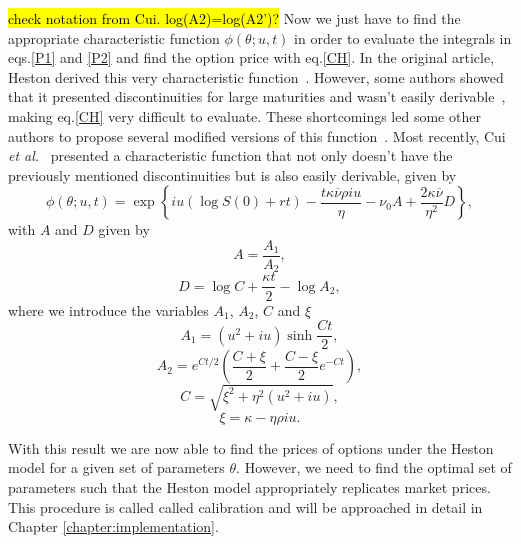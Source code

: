 \hl{check notation from Cui. log(A2)=log(A2')?}
Now we just have to find the appropriate characteristic function $\phi(\theta;u,t)$ in order to evaluate the integrals in eqs.\eqref{P1} and \eqref{P2} and find the option price with eq.\eqref{CH}. In the original article, Heston derived this very characteristic function~\cite{Heston}. However, some authors showed that it presented discontinuities for large maturities and wasn't easily derivable~\cite{Kahl}, making eq.\eqref{CH} very difficult to evaluate. These shortcomings led some other authors to propose several modified versions of this function~\cite{Rollin,Schoutens}. Most recently, Cui \textit{et al.}~\cite{Cui} presented a characteristic function that not only doesn't have the previously mentioned discontinuities but is also easily derivable, given by
\begin{equation}
\phi(\theta;u,t)=\exp\left\{iu\left(\log S(0)+rt\right)-\frac{t\kappa\overline{\nu}\rho iu}{\eta}-\nu_0A+\frac{2\kappa\overline{\nu}}{\eta^2}D\right\},
\end{equation}
\noindent with $A$ and $D$ given by
\begin{equation}
A=\frac{A_1}{A_2},
\end{equation}
\begin{equation}
D=\log C+\frac{\kappa t}{2}-\log A_2,
\end{equation}
\noindent where we introduce the variables $A_1$, $A_2$, $C$  and $\xi$
\begin{equation}
A_1=(u^2+iu)\sinh\frac{Ct}{2},
\end{equation}
\begin{equation}
A_2=e^{Ct/2}\left(\frac{C+\xi}{2}+\frac{C-\xi}{2}e^{-Ct}\right),
\end{equation}
\begin{equation}
C=\sqrt{\xi^2+\eta^2(u^2+iu)},
\end{equation}
\begin{equation}
\xi=\kappa-\eta\rho iu.
\end{equation}

With this result we are now able to find the prices of options under the Heston model for a given set of parameters $\theta$. However, we need to find the optimal set of parameters such that the Heston model appropriately replicates market prices. This procedure is called called calibration and will be approached in detail in Chapter \ref{chapter:implementation}.

\iffalse
Calibrating the parameters  $\rho$, $\kappa$, $\overline{\nu}$ and $\eta$ is absolutely critical. A model with badly calibrated parameters would output wrong predictions, rendering it completely useless.
This calibration requires a fair amount of past market data and is by far the most complex and computationally demanding section of this model. We will deal with it in the next section.
\fi





